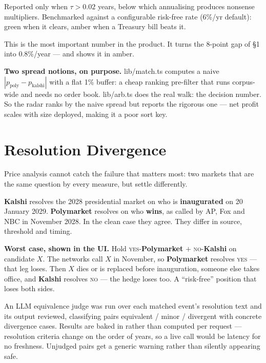 \documentclass[11pt,a4paper]{article}
\newcommand{\code}[1]{{\ttfamily\small #1}}
\newcommand{\file}[1]{{\ttfamily\small\color{slate} #1}}
\newcommand{\PM}{{\color{poly}\textbf{Polymarket}}}
\newcommand{\KS}{{\color{kalshi}\textbf{Kalshi}}}
\begin{document}
Reported only when $\tau > 0.02$ years, below which annualising produces nonsense multipliers.
Benchmarked against a configurable risk-free rate (6\%/yr default): green when it clears,
amber when a Treasury bill beats it.

This is the most important number in the product. It turns the 8-point gap of \S1 into
0.8\%/year --- and shows it in amber.

\textbf{Two spread notions, on purpose.} \file{lib/match.ts} computes a naive
$|p_{\text{poly}} - p_{\text{kalshi}}|$ with a flat 1\% buffer: a cheap ranking pre-filter that
runs corpus-wide and needs no order book. \file{lib/arb.ts} does the real walk: the decision
number. So the radar ranks by the naive spread but reports the rigorous one --- net profit
scales with size deployed, making it a poor sort key.

\section{Resolution Divergence}
\label{sec:div}

Price analysis cannot catch the failure that matters most: two markets that are the same
question by every measure, but settle differently.

\KS{} resolves the 2028 presidential market on who is \textbf{inaugurated} on 20 January 2029.
\PM{} resolves on who \textbf{wins}, as called by AP, Fox and NBC in November 2028. In the
clean case they agree. They differ in source, threshold and timing.

\begin{keybox}
\textbf{Worst case, shown in the UI.} Hold \textsc{yes}-\PM{} $+$ \textsc{no}-\KS{} on
candidate $X$. The networks call $X$ in November, so \PM{} resolves \textsc{yes} --- that leg
loses. Then $X$ dies or is replaced before inauguration, someone else takes office, and \KS{}
resolves \textsc{no} --- the hedge loses too. A ``risk-free'' position that loses both sides.
\end{keybox}

An LLM equivalence judge was run over each matched event's resolution text and its output
reviewed, classifying pairs \code{equivalent} / \code{minor} / \code{divergent} with concrete
divergence cases. Results are baked in rather than computed per request --- resolution criteria
change on the order of years, so a live call would be latency for no freshness. Unjudged pairs
get a generic warning rather than silently appearing safe.
\end{document}
